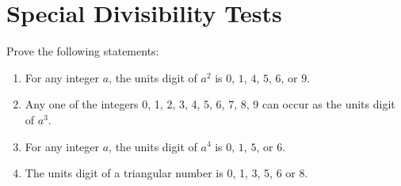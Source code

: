 \section{Special Divisibility Tests}

\begin{exercise}
    Prove the following statements:
    \begin{enumerate}
        \item For any integer $a$, the units digit of $a^2$ is $0$, $1$, $4$, $5$, $6$, or $9$.
        \item Any one of the integers 0, 1, 2, 3, 4, 5, 6, 7, 8, 9 can occur as the units digit of $a^3$.
        \item For any integer $a$, the units digit of $a^4$ is $0$, $1$, $5$, or $6$.
        \item The units digit of a triangular number is 0, 1, 3, 5, 6 or 8.
    \end{enumerate}
\end{exercise}

